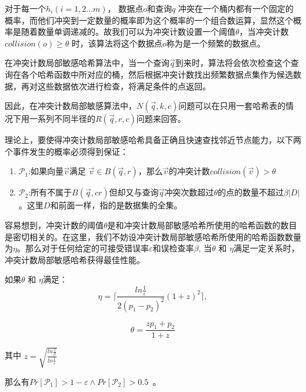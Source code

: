 对于每一个$ h_i(i = 1,2\dots m) $， 数据点$ o $和查询$ q $ 冲突在一个桶内都有一个固定的概率，而他们冲突到一定数量的概率即为这个概率的一个组合数运算，显然这个概率是随着数量单调递减的。故我们可以为冲突计数设置一个阈值$ \theta $，当冲突计数 $ collision(o) \ge \theta $ 时，该算法将这个数据点$ o $称为是一个频繁的数据点。

在冲突计数局部敏感哈希算法中，当一个查询$ \vec{q} $到来时，算法将会依次检查这个查询在各个哈希函数中所对应的桶，然后根据冲突计数找出频繁数据点集作为候选数据，再对这些数据依次进行检查，将满足条件的点返回。

因此，在冲突计数局部敏感算法中，$ N(\vec{q},k,c) $问题可以在只用一套哈希表的情况下用一系列不同半径的$ R(\vec{q},r,c) $问题来回答。

理论上，要使得冲突计数局部敏感哈希具备正确且快速查找邻近节点能力，以下两个事件发生的概率必须得到保证：

\begin{enumerate}
	\item $ \mathcal{P}_1 $:如果向量$ \vec{v} $满足 $ \vec{v} \in B(\vec{q},r) $，那么$ \vec{v} $的冲突计数$ collision(\vec{v}) > \theta$
	
	\item $ \mathcal{P}_2 $:所有不属于$ B(\vec{q},cr) $但却又与查询$ \vec{q} $冲突次数超过$ \theta $的点的数量不超过$ \beta|D| $。这里$ D $和前面一样，指的是数据集的全集。
\end{enumerate}

容易想到，冲突计数的阈值$ \theta $是和冲突计数局部敏感哈希所使用的哈希函数的数目是密切相关的。在这里，我们不妨设冲突计数局部敏感哈希所使用的哈希函数数量为$ \eta $。那么对于任何给定的可接受错误率$ \varepsilon $和误检查率$ \beta $, 当$ \theta $ 和 $ \eta $满足一定关系时，冲突计数局部敏感哈希获得最佳性能。

\begin{lemma}
	如果$ \theta $ 和 $ \eta $满足：
	\begin{equation}
	\eta = \lceil \frac{ln\frac{1}{\varepsilon}}{2(p_1-p_2)^2}(1+z)^2 \rceil,	
	\end{equation}
	
	\begin{equation}
	\theta = \frac{zp_1+p_2}{1+z}
	\end{equation}
	
	其中 $ z = \sqrt{\frac{ln\frac{2}{\beta}}{ln\frac{1}{\varepsilon}}} $
	
	那么有$ Pr[\mathcal{P}_1] > 1 - \varepsilon \land Pr[\mathcal{P}_2] > 0.5$~\cite{lazy21}。
\end{lemma}

